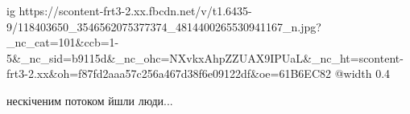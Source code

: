  
 
 
 
 

\ifcmt
  ig https://scontent-frt3-2.xx.fbcdn.net/v/t1.6435-9/118403650_3546562075377374_4814400265530941167_n.jpg?_nc_cat=101&ccb=1-5&_nc_sid=b9115d&_nc_ohc=NXvkxAhpZZUAX9IPUaL&_nc_ht=scontent-frt3-2.xx&oh=f87fd2aaa57c256a467d38f6e09122df&oe=61B6EC82
  @width 0.4
\fi


нескіченим потоком йшли люди...
